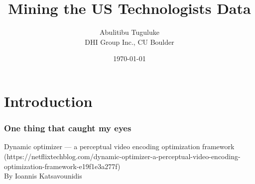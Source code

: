 \documentclass[10pt,mathserif]{beamer}
\title{\large \bfseries Mining the US Technologists Data}
\author{Abulitibu Tuguluke\\[3ex]
	DHI Group Inc., CU Boulder}
\date{\today}
\begin{document}
	
	\frame{
		\thispagestyle{empty}
		\titlepage
	}
	
	\section{Introduction}
	\begin{frame}
		\frametitle{One thing that caught my eyes}
		
		Dynamic optimizer — a perceptual video encoding optimization framework (https://netflixtechblog.com/dynamic-optimizer-a-perceptual-video-encoding-optimization-framework-e19f1e3a277f)\\
		By Ioannis Katsavounidis\\
		
	
	\end{frame}
	

	
	
\end{document}
